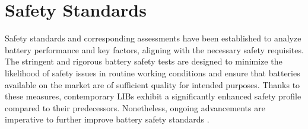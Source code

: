 








\section{Safety Standards}
\label{sec:safety-standards}
Safety standards and corresponding assessments have been established to analyze battery performance and key factors, aligning with the necessary safety requisites. The stringent and rigorous battery safety tests are designed to minimize the likelihood of safety issues in routine working conditions and ensure that batteries available on the market are of sufficient quality for intended purposes. Thanks to these measures, contemporary LIBs exhibit a significantly enhanced safety profile compared to their predecessors. Nonetheless, ongoing advancements are imperative to further improve battery safety standards \cite{chen2021review}.

